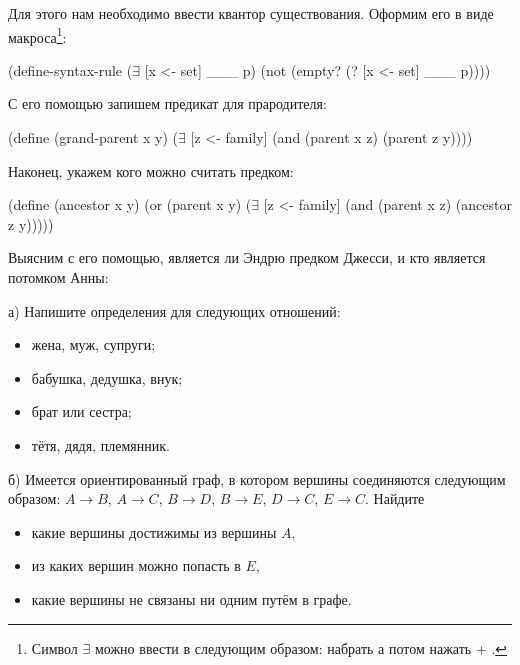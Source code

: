 Для этого нам необходимо ввести квантор существования. Оформим его в виде макроса\footnote{Символ $\exists$ можно ввести в  следующим образом: набрать \s{\\exists} а потом нажать  + \s{\\}.}:

\begin{Definition}[emph={x,set,p}]
(define-syntax-rule ($\exists$ [x <- set] ___ p)
  (not (empty? (? [x <- set] ___ p)))) 
\end{Definition}

С его помощью запишем предикат для прародителя:
\begin{Definition}[emph={x,y,z}]
(define (grand-parent x y)
  ($\exists$ [z <- family] (and (parent x z) (parent z y))))
\end{Definition}

Наконец, укажем кого можно считать предком:
\begin{Definition}[emph={x,y,z}]
(define (ancestor x y) 
  (or (parent x y)
      ($\exists$ [z <- family] (and (parent x z) (ancestor z y)))))  
\end{Definition}

Выясним с его помощью, является ли Эндрю предком Джесси, и кто является потомком Анны:

\newpage
\begin{Assignment}
а)  Напишите определения для следующих отношений:
\begin{itemize}
  \item жена, муж, супруги;
  \item бабушка, дедушка,  внук;
  \item брат или сестра;
  \item тётя, дядя, племянник.
\end{itemize}

\medskip
б)  Имеется ориентированный граф, в котором вершины соединяются следующим образом: $A\to B$, $A\to C$, $B\to D$, $B\to E$, $D\to C$, $E\to C$. Найдите
\begin{itemize}
\item какие вершины достижимы из вершины $A$,
\item из каких вершин можно попасть в $E$,
\item какие вершины не связаны ни одним путём в графе.
\end{itemize}
\end{Assignment}


